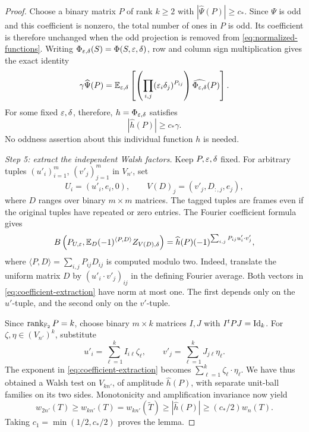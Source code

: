 \begin{proof}
Choose a binary matrix \(P\) of rank \(k\ge2\) with
\(|\widehat\Psi(P)|\ge c_*\).
Since \(\Psi\) is odd and this coefficient is nonzero, the total
number of ones in \(P\) is odd. Its coefficient is therefore
unchanged when the odd projection is removed from
\eqref{eq:normalized-functions}.
Writing \(\Phi_{\varepsilon,\delta}(S)=\Phi(S,\varepsilon,\delta)\), row and column
sign multiplication gives the exact identity
\[
\gamma\widehat\Psi(P)
=\mathbb E_{\varepsilon,\delta}
\left[\left(\prod_{i,j}(\varepsilon_i\delta_j)^{P_{ij}}\right)
\widehat{\Phi_{\varepsilon,\delta}}(P)\right].
\]
For some fixed \(\varepsilon,\delta\), therefore,
\(h=\Phi_{\varepsilon,\delta}\) satisfies
\begin{equation}\label{eq:h-coefficient}
|\widehat h(P)|\ge c_*\gamma.
\end{equation}
No oddness assertion about this individual function \(h\) is needed.

\medskip
\textit{Step 5: extract the independent Walsh factors.}
Keep \(P,\varepsilon,\delta\) fixed. For arbitrary tuples
\((u'_i)_{i=1}^m\), \((v'_j)_{j=1}^m\) in \(V_{n'}\), set
\[
U_i=(u'_i,e_i,0),\qquad
V(D)_j=(v'_j,D_{:,j},e_j),
\]
where \(D\) ranges over binary \(m\times m\) matrices.
The tagged tuples are frames even if the original tuples have
repeated or zero entries.
The Fourier coefficient formula gives
\begin{equation}\label{eq:coefficient-extraction}
B\left(P_{U,\varepsilon},
\mathbb E_D(-1)^{\langle P,D\rangle}Z_{V(D),\delta}\right)
=\widehat h(P)(-1)^{\sum_{i,j}P_{ij}u'_i\cdot v'_j},
\end{equation}
where \(\langle P,D\rangle=\sum_{i,j}P_{ij}D_{ij}\) is computed modulo
two. Indeed, translate the uniform matrix \(D\) by
\((u'_i\cdot v'_j)_{ij}\) in the defining Fourier average.
Both vectors in \eqref{eq:coefficient-extraction} have norm at most
one. The first depends only on the \(u'\)-tuple, and the second only
on the \(v'\)-tuple.

Since \(\operatorname{rank}_{\mathbb F_2}P=k\), choose binary \(m\times k\) matrices
\(I,J\) with \(I^tPJ=\mathrm{Id}_k\).
For \(\zeta,\eta\in(V_{n'})^k\), substitute
\[
u'_i=\sum_{\ell=1}^k I_{i\ell}\zeta_\ell,\qquad
v'_j=\sum_{\ell=1}^k J_{j\ell}\eta_\ell.
\]
The exponent in \eqref{eq:coefficient-extraction} becomes
\(\sum_{\ell=1}^k\zeta_\ell\cdot\eta_\ell\).
We have thus obtained a Walsh test on \(V_{kn'}\), of amplitude
\(\widehat h(P)\), with separate unit-ball families on its two sides.
Monotonicity and amplification invariance now yield
\[
w_{2n'}(T)\ge w_{kn'}(T)
=w_{kn'}(\widetilde T)\ge|\widehat h(P)|
\ge(c_*/2)w_n(T).
\]
Taking \(c_1=\min(1/2,c_*/2)\) proves the lemma.
\end{proof}

